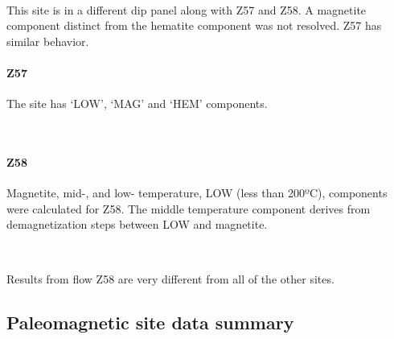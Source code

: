 \documentclass[11pt]{article}
\begin{document}
    \begin{center}
    \end{center}
    { \hspace*{\fill} \\}
    
    This site is in a different dip panel along with Z57 and Z58. A
magnetite component distinct from the hematite component was not
resolved. Z57 has similar behavior.

    \paragraph{Z57}\label{z57}

    The site has `LOW', `MAG' and `HEM' components.



    \begin{center}
    \end{center}
    { \hspace*{\fill} \\}
    
    \paragraph{Z58}\label{z58}

    Magnetite, mid-, and low- temperature, LOW (less than 200ºC), components
were calculated for Z58. The middle temperature component derives from
demagnetization steps between LOW and magnetite.



    \begin{center}
    \end{center}
    { \hspace*{\fill} \\}
    
    Results from flow Z58 are very different from all of the other sites.

    \subsection{Paleomagnetic site data
summary}\label{paleomagnetic-site-data-summary}
\end{document}
